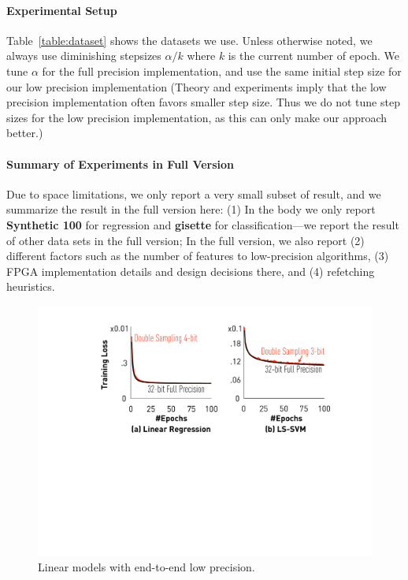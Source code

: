 \documentclass{article}
\begin{document}
\paragraph{Experimental Setup} 
Table~\ref{table:dataset} shows the 
datasets we use. 
Unless otherwise noted, we always
use diminishing stepsizes $\alpha/k$
where $k$ is the current number of
epoch. We tune 
$\alpha$ for the full precision
implementation, and use the
same initial step size for 
our low precision 
implementation (Theory and
experiments imply that the low precision
implementation often favors smaller step size. 
Thus we do not tune step sizes for the low precision 
implementation, as this can only make our 
approach better.) 

\vspace{-1em}
\paragraph*{Summary of Experiments in Full Version}
Due to space limitations, we only
report a very small subset of result, and
we summarize the result in the full
version here: (1) In the body we only report
{\bf Synthetic 100} for regression and 
{\bf gisette} for classification---we
report the result of other data sets 
in the full version; In the
full version, we also report (2) different
factors such as the number of features
to low-precision algorithms, (3) FPGA
implementation details and design
decisions there, and (4) refetching
heuristics.





\begin{figure}[t]
\centering
\includegraphics[width=0.7\columnwidth]{final-experiments/linearmodel} 
\vspace{-1em}
\caption{Linear models with end-to-end low precision.}
\label{fig:convergence}
\end{figure}
\end{document}
